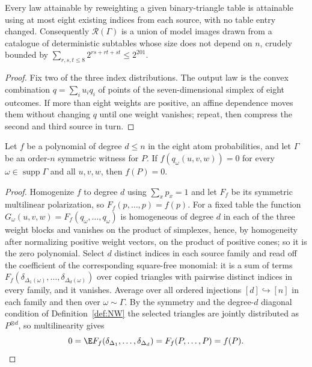 \begin{proposition}\label{prop:compression}
Every law attainable by reweighting a given binary-triangle table is attainable using at most eight existing indices from each source, with no table entry changed. Consequently $\mathcal R(\Gamma)$ is a union of model images drawn from a catalogue of deterministic subtables whose size does not depend on $n$, crudely bounded by $\sum_{r,s,t\le8}2^{rs+rt+st}\le2^{201}$.
\end{proposition}

\begin{proof}
Fix two of the three index distributions. The output law is the convex combination $q=\sum_iu_iq_i$ of points of the seven-dimensional simplex of eight outcomes. If more than eight weights are positive, an affine dependence moves them without changing $q$ until one weight vanishes; repeat, then compress the second and third source in turn.
\end{proof}

\begin{theorem}\label{thm:identitytransfer}
Let $f$ be a polynomial of degree $d\le n$ in the eight atom probabilities, and let $\Gamma$ be an order-$n$ symmetric witness for $P$. If $f(q_\omega(u,v,w))=0$ for every $\omega\in\operatorname{supp}\Gamma$ and all $u,v,w$, then $f(P)=0$.
\end{theorem}

\begin{proof}
Homogenize $f$ to degree $d$ using $\sum_xp_x=1$ and let $F_f$ be its symmetric multilinear polarization, so $F_f(p,\dots,p)=f(p)$. For a fixed table the function $G_\omega(u,v,w)=F_f(q_\omega,\dots,q_\omega)$ is homogeneous of degree $d$ in each of the three weight blocks and vanishes on the product of simplexes, hence, by homogeneity after normalizing positive weight vectors, on the product of positive cones; so it is the zero polynomial. Select $d$ distinct indices in each source family and read off the coefficient of the corresponding square-free monomial: it is a sum of terms $F_f(\delta_{\Delta_1(\omega)},\dots,\delta_{\Delta_d(\omega)})$ over copied triangles with pairwise distinct indices in every family, and it vanishes. Average over all ordered injections $[d]\hookrightarrow[n]$ in each family and then over $\omega\sim\Gamma$. By the symmetry and the degree-$d$ diagonal condition of Definition~\ref{def:NW} the selected triangles are jointly distributed as $P^{\otimes d}$, so multilinearity gives
\[
0=\E F_f(\delta_{\Delta_1},\dots,\delta_{\Delta_d})=F_f(P,\dots,P)=f(P). \qedhere
\]
\end{proof}

